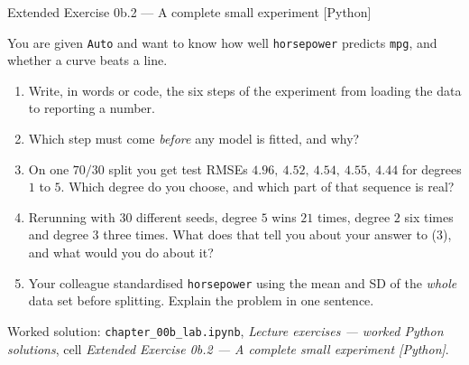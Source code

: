 \documentclass[aspectratio=169,11pt]{beamer}
\begin{document}
\begin{frame}{Extended Exercise 0b.2 --- A complete small experiment [Python]}
  \begin{longexercise}
    You are given \texttt{Auto} and want to know how well \texttt{horsepower}
    predicts \texttt{mpg}, and whether a curve beats a line.
    \begin{enumerate}\setlength{\itemsep}{0pt}
      \item Write, in words or code, the six steps of the experiment from
            loading the data to reporting a number.
      \item Which step must come \emph{before} any model is fitted, and why?
      \item On one $70/30$ split you get test RMSEs
            $4.96,\ 4.52,\ 4.54,\ 4.55,\ 4.44$ for degrees $1$ to $5$. Which
            degree do you choose, and which part of that sequence is real?
      \item Rerunning with $30$ different seeds, degree $5$ wins $21$ times,
            degree $2$ six times and degree $3$ three times. What does that
            tell you about your answer to (3), and what would you do about it?
      \item Your colleague standardised \texttt{horsepower} using the mean and
            SD of the \emph{whole} data set before splitting. Explain the
            problem in one sentence.
    \end{enumerate}
  \end{longexercise}
  \vspace{-6pt}
  \begin{labnote}
    Worked solution: \texttt{chapter\_00b\_lab.ipynb}, \emph{Lecture exercises
    --- worked Python solutions}, cell \emph{Extended Exercise 0b.2 --- A complete small experiment [Python]}.
  \end{labnote}
\end{frame}
\end{document}

